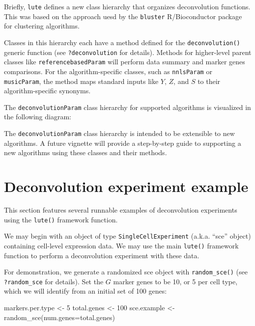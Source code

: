 \documentclass[]{article}
\newcommand{\hlnum}[1]{\textcolor[rgb]{0.816,0.125,0.439}{#1}}%
\newcommand{\hlstd}[1]{\textcolor[rgb]{0.251,0.251,0.251}{#1}}%
\newenvironment{Shaded}{\begin{myshaded}}{\end{myshaded}}
\newcommand{\DecValTok}[1]{\hlnum{#1}}
\newcommand{\OtherTok}[1]{{#1}}
\newcommand{\FunctionTok}[1]{\hlstd{#1}}
\newcommand{\AttributeTok}[1]{{#1}}
\newcommand{\NormalTok}[1]{\hlstd{#1}}
\begin{document}
Briefly, \texttt{lute} defines a new class hierarchy that organizes deconvolution
functions. This was based on the approach uesd by the \texttt{bluster} R/Bioconductor
package for clustering algorithms.

Classes in this hierarchy each have a method defined for the \texttt{deconvolution()}
generic function (see \texttt{?deconvolution} for details). Methods for higher-level
parent classes like \texttt{referencebasedParam} will perform data summary and marker
genes comparisons. For the algorithm-specific classes, such as \texttt{nnlsParam} or
\texttt{musicParam}, the method maps standard inputs like \(Y\), \(Z\), and \(S\) to their
algorithm-specific synonyms.

The \texttt{deconvolutionParam} class hierarchy for supported algorithms is visualized
in the following diagram:

The \texttt{deconvolutionParam} class hierarchy is intended to be extensible to new
algorithms. A future vignette will provide a step-by-step guide to supporting
a new algorithms using these classes and their methods.

\hypertarget{deconvolution-experiment-example}{%
\section{Deconvolution experiment example}\label{deconvolution-experiment-example}}

This section features several runnable examples of deconvolution experiments
using the \texttt{lute()} framework function.

We may begin with an object of type \texttt{SingleCellExperiment} (a.k.a. ``sce'' object)
containing cell-level expression data. We may use the main \texttt{lute()} framework
function to perform a deconvolution experiment with these data.

For demonstration, we generate a randomized sce object with \texttt{random\_sce()} (see
\texttt{?random\_sce} for details). Set the \(G\) marker genes to be 10, or 5 per cell
type, which we will identify from an initial set of 100 genes:

\begin{Shaded}
\begin{Highlighting}[]
\NormalTok{markers.per.type }\OtherTok{\textless{}{-}} \DecValTok{5}
\NormalTok{total.genes }\OtherTok{\textless{}{-}} \DecValTok{100}
\NormalTok{sce.example }\OtherTok{\textless{}{-}} \FunctionTok{random\_sce}\NormalTok{(}\AttributeTok{num.genes=}\NormalTok{total.genes)}
\end{Highlighting}
\end{Shaded}
\end{document}
